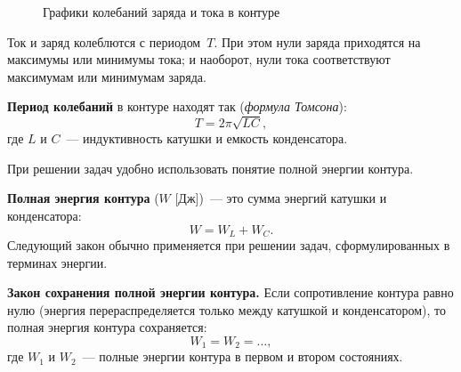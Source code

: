 \documentclass[main.tex]{subfiles}
\begin{document}
\begin{NoHyper}
\begin{figure}[H]
\caption{Графики колебаний заряда и тока в контуре}
\label{fig:p167}
\end{figure}

Ток и заряд колеблются с периодом~$T$.
При этом нули заряда приходятся на максимумы или минимумы тока; и наоборот, нули тока соответствуют максимумам или минимумам заряда.

\textbf{Период колебаний} в контуре находят так (\emph{формула Томсона}):
\begin{equation}
    T=2\pi\sqrt{LC},
\end{equation}
где $L$ и $C$~--- индуктивность катушки и емкость конденсатора. 

При решении задач удобно использовать понятие полной энергии контура.

\textbf{Полная энергия контура} ($W$ [Дж])~--- это сумма энергий катушки и конденсатора:
\begin{equation}
    W=W_L+W_C.
\end{equation}
%
%
Следующий закон обычно применяется при решении задач, сформулированных в терминах энергии.
%
\begin{law}
    \textbf{Закон сохранения полной энергии контура.} Если сопротивление контура равно нулю (энергия перераспределяется только между катушкой и конденсатором), то полная энергия контура сохраняется:
    \begin{equation}
        W_1=W_2=\ldots,
    \end{equation}
    где $W_1$ и $W_2$~--- полные энергии контура в первом и втором состояниях. 
\end{law}




\end{NoHyper}
\end{document}
